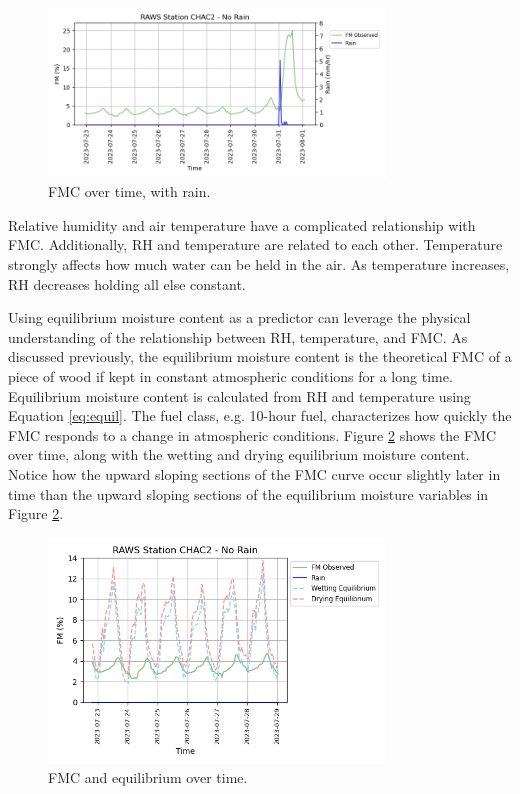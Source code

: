 \documentclass[11pt]{article}%
\begin{document}
\begin{figure}[ht]
    \centering
    \includegraphics[width=0.8\textwidth]{images/rain_plot.png}
    \caption{FMC over time, with rain.}
    \label{fig:fmc_with_rain}
\end{figure}

Relative humidity and air temperature have a complicated relationship with FMC. Additionally, RH and temperature are related to each other. Temperature strongly affects how much water can be held in the air. As temperature increases, RH decreases holding all else constant. 

Using equilibrium moisture content as a predictor can leverage the physical understanding of the relationship between RH, temperature, and FMC. As discussed previously, the equilibrium moisture content is the theoretical FMC of a piece of wood if kept in constant atmospheric conditions for a long time. Equilibrium moisture content is calculated from RH and temperature using Equation \ref{eq:equil}. The fuel class, e.g. 10-hour fuel, characterizes how quickly the FMC responds to a change in atmospheric conditions. Figure \ref{fig:eq_plot} shows the FMC over time, along with the wetting and drying equilibrium moisture content. Notice how the upward sloping sections of the FMC curve occur slightly later in time than the upward sloping sections of the equilibrium moisture variables in Figure \ref{fig:eq_plot}. 

\begin{figure}[ht]
    \centering
    \includegraphics[width=0.8\textwidth]{images/eq_plot.png}
    \caption{FMC and equilibrium over time.}
    \label{fig:eq_plot}
\end{figure}
\end{document}
